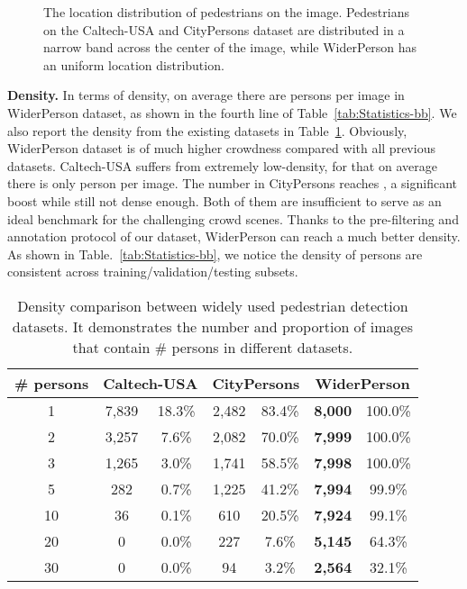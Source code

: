 \documentclass[journal]{IEEEtran}
\begin{document}
\begin{figure*}[t]
\centering
{}
\caption{The location distribution of pedestrians on the image. Pedestrians on the Caltech-USA and CityPersons dataset are distributed in a narrow band across the center of the image, while WiderPerson has an uniform location distribution.}
\label{fig:heatmap}
\end{figure*}


{\flushleft \textbf{Density. }}
In terms of density, on average there are  persons per image in WiderPerson dataset, as shown in the fourth line of Table~\ref{tab:Statistics-bb}. We also report the density from the existing datasets in Table~\ref{tab:density}. Obviously, WiderPerson dataset is of much higher crowdness compared with all previous datasets. Caltech-USA suffers from extremely low-density, for that on average there is only  person per image. The number in CityPersons reaches , a significant boost while still not dense enough. Both of them are insufficient to serve as an ideal benchmark for the challenging crowd scenes. Thanks to the pre-filtering and annotation protocol of our dataset, WiderPerson can reach a much better density. As shown in Table.~\ref{tab:Statistics-bb}, we notice the density of persons are consistent across training/validation/testing subsets.

\begin{table}[t]
\caption{Density comparison between widely used pedestrian detection datasets. It demonstrates the number and proportion of images that contain  \# persons in different datasets.}
\label{tab:density}
\setlength{\tabcolsep}{7pt}
\begin{center}
\begin{tabular}{c|cc|cc|cc}
\toprule[2pt]
{\# persons} & \multicolumn{2}{c|}{Caltech-USA} & \multicolumn{2}{c|}{CityPersons} & \multicolumn{2}{c}{WiderPerson} \\
\midrule
1 & {7,839} & {18.3\%} & {2,482} & {83.4\%} & \textbf{8,000} & {100.0\%} \\
2 & {3,257} & {7.6\%} & {2,082} & {70.0\%} & \textbf{7,999} & {100.0\%} \\
3 & {1,265} & {3.0\%} & {1,741} & {58.5\%} & \textbf{7,998} & {100.0\%} \\
5 & {282} & {0.7\%} & {1,225} & {41.2\%} & \textbf{7,994} & {99.9\%} \\
10 & {36} & {0.1\%} & {610} & {20.5\%} & \textbf{7,924} & {99.1\%} \\
20 & {0} & {0.0\%} & {227} & {7.6\%} & \textbf{5,145} & {64.3\%} \\
30 & {0} & {0.0\%} & {94} & {3.2\%} & \textbf{2,564} & {32.1\%} \\
\bottomrule[2pt]
\end{tabular}
\end{center}
\end{table}
\end{document}
